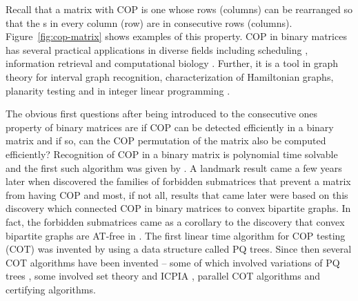 \documentclass[MS]             %
              {iitmdiss_as}    %
\begin{document}
Recall that a matrix with COP is one whose rows (columns)
can be rearranged so that the {\un}s in every column (row) are in
consecutive rows (columns). Figure~\ref{fig:cop-matrix} shows examples
of this property.
COP in binary matrices has several practical applications in diverse
fields including scheduling \cite{hl06}, information retrieval
\cite{k77} and computational biology \cite{abh98}.  Further, it is a
tool in graph theory \cite{mcg04} for interval graph recognition,
characterization of Hamiltonian graphs, planarity testing \cite{bl76}
and in integer linear programming \cite{ht02,hl06}.


The obvious first questions after being introduced to the consecutive
ones property of binary matrices are if COP can be detected
efficiently in a binary matrix and if so, can the COP permutation of
the matrix also be computed efficiently?  Recognition of COP in a
binary matrix is polynomial time solvable and the first such algorithm
was given by \cite{fg65}.  A landmark result came a few years later
when \cite{at72} discovered the families of forbidden submatrices that
prevent a matrix from having COP and most, if not all, results that
came later were based on this discovery which connected COP in binary
matrices to convex bipartite graphs. In fact, the forbidden
submatrices came as a corollary to the discovery that convex bipartite
graphs are AT-free in \cite{at72}. The first linear time
algorithm for COP testing (COT) was invented by \cite{bl76} using a
data structure called PQ trees.  Since then several COT algorithms
have been invented -- some of which involved variations of PQ trees
\cite{mm96,wlh01,mcc04}, some involved set theory and ICPIA
\cite{wlh02,nsnrs09}, parallel COT algorithms\cite{as95,bs03,ly91} and
certifying algorithms\cite{mcc04}. %
\end{document}
